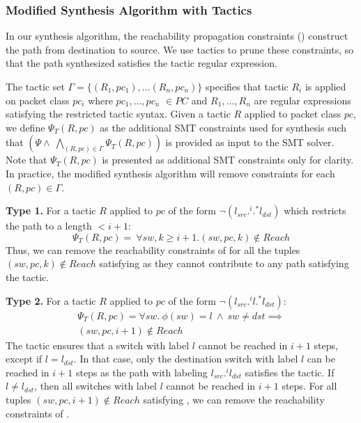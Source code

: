 \subsubsection{Modified Synthesis Algorithm with Tactics}
In our synthesis algorithm, the reachability propagation constraints () 
construct the path from destination to source. We use tactics to prune these constraints, so that
the path synthesized satisfies the tactic regular expression.  

The tactic set $\Gamma = \{(R_1, pc_1), \ldots (R_n, pc_n)\}$
specifies that tactic $R_i$ is applied on packet class $pc_i$ where 
$pc_1, \ldots, pc_n$ $\in PC$ and $R_1,\ldots,R_n$ are regular
expressions satisfying the restricted tactic syntax. 
Given a tactic $R$ applied to packet class $pc$, 
we define $\Psi_T(R,pc)$ as the additional SMT constraints used for 
synthesis such that  $(\Psi \wedge\ \bigwedge\limits_{(R, pc) \in \Gamma} \Psi_T(R,pc))$ 
is provided as input to the SMT solver.
	Note that $\Psi_T(R,pc)$ is presented as additional SMT 
constraints only for clarity. 
In practice, the modified synthesis algorithm will remove constraints for each 
$(R,pc)\in \Gamma$.

\noindent\textbf{Type 1.} For a tactic $R$ applied to $pc$ of the form $\neg (l_{src} .^i .^* l_{dst})$ which restricts the path to a length $ < i + 1$:
\begin{equation} \label{eq:type1}
	\Psi_T(R, pc) = ~ \forall sw,k \geq i + 1. (sw,pc,k) \notin Reach
\end{equation}
Thus, we can remove the reachability constraints  of  
for all the tuples $(sw,pc,k) \notin Reach$ satisfying 
as they cannot contribute to any path satisfying the tactic.  

\noindent\textbf{Type 2.} For a tactic $R$ applied to $pc$ 
of the form $\neg (l_{src}  .^i l .^* l_{dst})$:
\begin{multline} \label{eq:t1}
\Psi_T(R,pc) = \forall sw.~ \phi(sw) = l ~\wedge~ sw \not= dst \implies \\ 
(sw, pc, i + 1) \notin Reach
\end{multline}
The tactic ensures that a switch with label $l$ cannot be reached in $i+1$
steps, except if $l = l_{dst}$. In that case,
only the destination switch with label $l$ can be reached in $i+1$ steps as 
the path with labeling $l_{src}.^i l_{dst}$ satisfies the tactic. If $l \not= l_{dst}$, then
all switches with label $l$ cannot be reached in $i+1$ steps. For all tuples
$(sw, pc, i+1) \notin Reach$ satisfying , we can remove the reachability constraints of .


